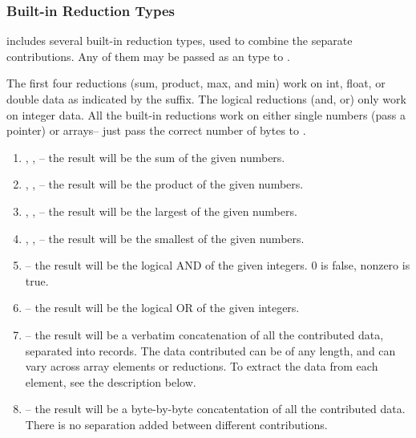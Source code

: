 \subsubsection{Built-in Reduction Types}

\charmpp{} includes several built-in reduction types, used to combine 
the separate contributions.  Any of them may be passed as an
 type to .

The first four reductions (sum, product, max, and min) work on int,
float, or double data as indicated by the suffix.  The logical
reductions (and, or) only work on integer data.  All the built-in
reductions work on either single numbers (pass a pointer) or arrays-- just
pass the correct number of bytes to .

\begin{enumerate}

\item {}, , -- the
result will be the sum of the given numbers.

\item {}, ,
-- the result will be the product of the given numbers.

\item {}, , -- the
result will be the largest of the given numbers.

\item {}, , -- the
result will be the smallest of the given numbers.

\item {}-- the result will be the logical AND of the given
integers.  0 is false, nonzero is true.

\item {}-- the result will be the logical OR of the given
integers.

\item {}-- the result will be a verbatim concatenation of
all the contributed data, separated into  records.
The data contributed can be of any length, and can vary across array elements
or reductions.  To extract the data from each element, see the description
below.

\item {}-- the result will be a byte-by-byte
concatentation of all the contributed data.  There is no separation
added between different contributions.

\end{enumerate}


